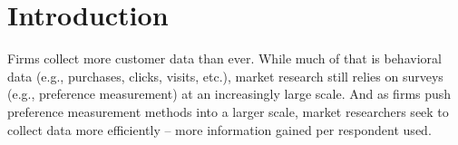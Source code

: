 \documentclass[nonblindrev]{informs3}
\begin{document}
%

\section{Introduction}

Firms collect more customer data than ever. While much of that is behavioral data (e.g., purchases, clicks, visits, etc.), market research still relies on surveys (e.g., preference measurement) at an increasingly large scale. And as firms push preference measurement methods into a larger scale, market researchers seek to collect data more efficiently -- more information gained per respondent used.  
\end{document}
